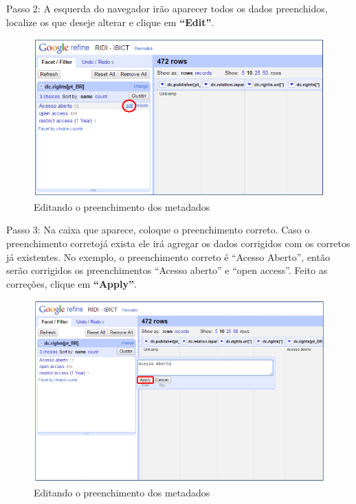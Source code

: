 \documentclass[12pt,hidelinks]{article}
\begin{document}
\newpage

    Passo 2: A esquerda do navegador irão aparecer todos os dados preenchidos, localize os que deseje alterar e clique em \textbf{“Edit”}.
    
    \begin{figure}[!htp]
                \centering
                \includegraphics[scale=0.8]{figura/Figura191.png}
                \caption{Editando o preenchimento dos metadados}
            \label{Rotulo}
        \end{figure}
    
    Passo 3: Na caixa que aparece, coloque o preenchimento correto. Caso o preenchimento corretojá exista ele irá agregar os dados corrigidos com os corretos já existentes. No exemplo, o preenchimento correto é “Acesso Aberto”, então serão corrigidos os preenchimentos “Acesso aberto” e “open access”. Feito as correções, clique em \textbf{“Apply”}.
    
    \begin{figure}[!htp]
                \centering
                \includegraphics[scale=0.7]{figura/Figura192.png}
                \caption{Editando o preenchimento dos metadados}
            \label{Rotulo}
        \end{figure}
\end{document}
